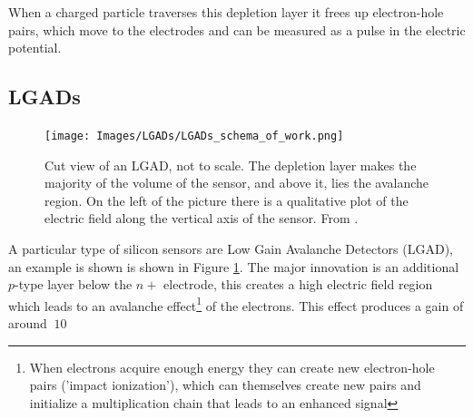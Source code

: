 When a charged particle traverses this depletion layer it frees up electron-hole pairs, which move to the electrodes and can be measured as a pulse in the electric potential. 


\subsection{LGADs}

\begin{figure}[!ht]
    \centering
    \texttt{[image: Images/LGADs/LGADs\_schema\_of\_work.png]}
    \caption{Cut view of an LGAD, not to scale. The depletion layer makes the majority of the volume of the sensor, and above it, lies the avalanche region. On the left of the picture there is a qualitative plot of the electric field along the vertical axis of the sensor. From \cite{cernTechnicalDesign}.}
    \label{fig:LGADs_schema}
\end{figure}

A particular type of silicon sensors are Low Gain Avalanche Detectors (LGAD), an example is shown is shown in Figure \ref{fig:LGADs_schema}. The major innovation is an additional $p$-type layer below the $n+$ electrode, this creates a high electric field region which leads to an avalanche effect\footnote[2]{When electrons acquire enough energy they can create new electron-hole pairs ('impact ionization'), which can themselves create new pairs and initialize a multiplication chain that leads to an enhanced signal} of the electrons. This effect produces a gain of around $~10$  




